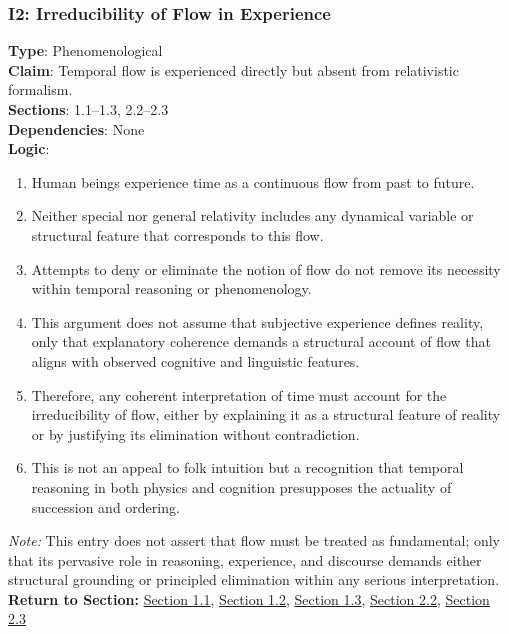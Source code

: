 \documentclass[12pt]{book}
\begin{document}
\subsubsection*{I2: Irreducibility of Flow in Experience}
\label{appendix:I2}
\textbf{Type}: Phenomenological\\
\textbf{Claim}: Temporal flow is experienced directly but absent from relativistic formalism.\\
\textbf{Sections}: 1.1–1.3, 2.2–2.3\\
\textbf{Dependencies}: None\\
\textbf{Logic}:
\begin{enumerate}
    \item Human beings experience time as a continuous flow from past to future.
    \item Neither special nor general relativity includes any dynamical variable or structural feature that corresponds to this flow.
    \item Attempts to deny or eliminate the notion of flow do not remove its necessity within temporal reasoning or phenomenology.
    \item This argument does not assume that subjective experience defines reality, only that explanatory coherence demands a structural account of flow that aligns with observed cognitive and linguistic features.
    \item Therefore, any coherent interpretation of time must account for the irreducibility of flow, either by explaining it as a structural feature of reality or by justifying its elimination without contradiction.
    \item This is not an appeal to folk intuition but a recognition that temporal reasoning in both physics and cognition presupposes the actuality of succession and ordering.
\end{enumerate}
\textit{Note:} This entry does not assert that flow must be treated as fundamental; only that its pervasive role in reasoning, experience, and discourse demands either structural grounding or principled elimination within any serious interpretation.\\
\textbf{Return to Section:} \hyperref[sec:1.1]{Section 1.1}, \hyperref[sec:1.2]{Section 1.2}, \hyperref[sec:1.3]{Section 1.3}, \hyperref[sec:2.2]{Section 2.2}, \hyperref[sec:2.3]{Section 2.3}
\end{document}
